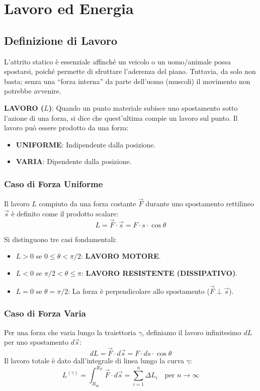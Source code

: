 \chapter{Lavoro ed Energia}
\section{Definizione di Lavoro}
L'attrito statico è essenziale affinché un veicolo o un uomo/animale possa spostarsi, poiché permette di sfruttare l'aderenza del piano. Tuttavia, da solo non basta; senza una ``forza interna'' da parte dell'uomo (muscoli) il movimento non potrebbe avvenire.

\textbf{LAVORO ($L$)}: Quando un punto materiale subisce uno spostamento sotto l'azione di una forza, si dice che quest'ultima compie un lavoro sul punto. 
Il lavoro può essere prodotto da una forza:
\begin{itemize}
    \item \textbf{UNIFORME}: Indipendente dalla posizione.
    \item \textbf{VARIA}: Dipendente dalla posizione.
\end{itemize}

\subsection{Caso di Forza Uniforme}
Il lavoro $L$ compiuto da una forza costante $\vec{F}$ durante uno spostamento rettilineo $\vec{s}$ è definito come il prodotto scalare:
\begin{equation}
    L = \vec{F} \cdot \vec{s} = F \cdot s \cdot \cos\theta
\end{equation}

Si distinguono tre casi fondamentali:
\begin{itemize}
    \item $L > 0$ se $0 \leq \theta < \pi/2$: \textbf{LAVORO MOTORE}.
    \item $L < 0$ se $\pi/2 < \theta \leq \pi$: \textbf{LAVORO RESISTENTE (DISSIPATIVO)}.
    \item $L = 0$ se $\theta = \pi/2$: La forza è perpendicolare allo spostamento ($\vec{F} \perp \vec{s}$).
\end{itemize}

\subsection{Caso di Forza Varia}
Per una forza che varia lungo la traiettoria $\gamma$, definiamo il lavoro infinitesimo $dL$ per uno spostamento $d\vec{s}$:
\begin{equation}
    dL = \vec{F} \cdot d\vec{s} = F \cdot ds \cdot \cos\theta
\end{equation}
Il lavoro totale è dato dall'integrale di linea lungo la curva $\gamma$:
\begin{equation}
    L^{(\gamma)} = \int_{R_{\text{in}}}^{R_F} \vec{F} \cdot d\vec{s} = \sum_{i=1}^n \Delta L_i \quad \text{per } n \to \infty
\end{equation}


